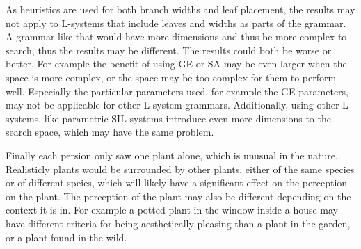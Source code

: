 As heuristics are used for both branch widths and leaf placement, the results may not apply to L-systems that include leaves and widths as parts of the grammar.
A grammar like that would have more dimensions and thus be more complex to search, thus the results may be different.
The results could both be worse or better.
For example the benefit of using GE or SA may be even larger when the space is more complex, or the space may be too complex for them to perform well.
Especially the particular parameters used, for example the GE parameters, may not be applicable for other L-system grammars.
Additionally, using other L-systems, like parametric SIL-systems introduce even more dimensions to the search space, which may have the same problem.

Finally each persion only saw one plant alone, which is unusual in the nature.
Realisticly plants would be surrounded by other plants, either of the same species or of different speies, which will likely have a significant effect on the perception on the plant.
The perception of the plant may also be different depending on the context it is in.
For example a potted plant in the window inside a house may have different criteria for being aesthetically pleasing than a plant in the garden, or a plant found in the wild.

